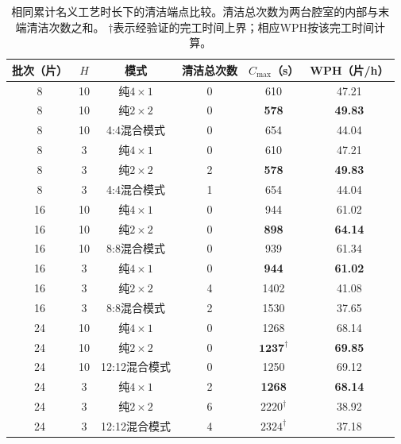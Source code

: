 \documentclass[final,5p,times,twocolumn]{elsarticle}
\begin{document}
\begin{table}[!htbp]
\centering
\scriptsize
\setlength{\tabcolsep}{4pt}
\caption{相同累计名义工艺时长下的清洁端点比较。清洁总次数为两台腔室的内部与末端清洁次数之和。 $\dagger$表示经验证的完工时间上界；相应WPH按该完工时间计算。}
\label{tab:mode-extended-zh}
\begin{tabular}{cccccc}
\toprule
批次（片） & $H$ & 模式 & 清洁总次数 & $C_{\max}$（s） & WPH（片/h）\\
\midrule
8 & 10 & 纯$4\times1$ & 0 & 610 & 47.21\\
8 & 10 & 纯$2\times2$ & 0 & \textbf{578} & \textbf{49.83}\\
8 & 10 & 4:4混合模式 & 0 & 654 & 44.04\\
8 & 3 & 纯$4\times1$ & 0 & 610 & 47.21\\
8 & 3 & 纯$2\times2$ & 2 & \textbf{578} & \textbf{49.83}\\
8 & 3 & 4:4混合模式 & 1 & 654 & 44.04\\
\midrule
16 & 10 & 纯$4\times1$ & 0 & 944 & 61.02\\
16 & 10 & 纯$2\times2$ & 0 & \textbf{898} & \textbf{64.14}\\
16 & 10 & 8:8混合模式 & 0 & 939 & 61.34\\
16 & 3 & 纯$4\times1$ & 0 & \textbf{944} & \textbf{61.02}\\
16 & 3 & 纯$2\times2$ & 4 & 1402 & 41.08\\
16 & 3 & 8:8混合模式 & 2 & 1530 & 37.65\\
\midrule
24 & 10 & 纯$4\times1$ & 0 & 1268 & 68.14\\
24 & 10 & 纯$2\times2$ & 0 & $\mathbf{1237}^{\dagger}$ & \textbf{69.85}\\
24 & 10 & 12:12混合模式 & 0 & 1250 & 69.12\\
24 & 3 & 纯$4\times1$ & 2 & \textbf{1268} & \textbf{68.14}\\
24 & 3 & 纯$2\times2$ & 6 & $2220^{\dagger}$ & 38.92\\
24 & 3 & 12:12混合模式 & 4 & $2324^{\dagger}$ & 37.18\\
\bottomrule
\end{tabular}
\end{table}
\end{document}
